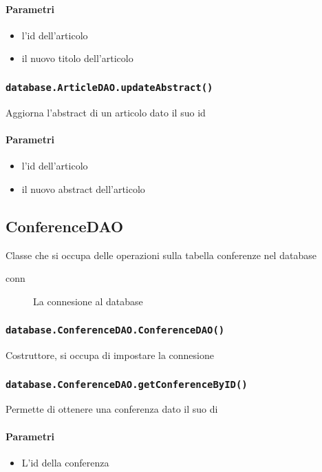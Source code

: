 \paragraph{Parametri}
\begin{itemize}
\item l'id dell'articolo              
\item il nuovo titolo dell'articolo
\end{itemize}

\subsubsection{\texttt{database.ArticleDAO.updateAbstract()}}
Aggiorna l'abstract di un articolo dato il suo id
\paragraph{Parametri}
\begin{itemize}
\item l'id dell'articolo              
\item il nuovo abstract dell'articolo
\end{itemize}

\subsection{ConferenceDAO}
Classe che si occupa delle operazioni sulla tabella conferenze nel database
\begin{description}
\item[conn] La connesione al database
\end{description}

\subsubsection{\texttt{database.ConferenceDAO.ConferenceDAO()}}
Costruttore, si occupa di impostare la connesione

\subsubsection{\texttt{database.ConferenceDAO.getConferenceByID()}}
Permette di ottenere una conferenza dato il suo di
\paragraph{Parametri}
\begin{itemize}
\item L'id della conferenza
\end{itemize}
